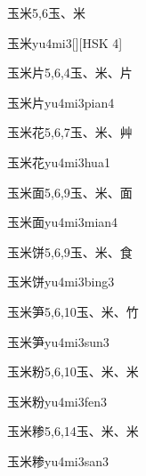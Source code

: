 \begin{entry}{玉米}{5,6}{⽟、⽶}
  \begin{phonetics}{玉米}{yu4mi3}[][HSK 4]
  \end{phonetics}
\end{entry}

\begin{entry}{玉米片}{5,6,4}{⽟、⽶、⽚}
  \begin{phonetics}{玉米片}{yu4mi3pian4}
  \end{phonetics}
\end{entry}

\begin{entry}{玉米花}{5,6,7}{⽟、⽶、⾋}
  \begin{phonetics}{玉米花}{yu4mi3hua1}
  \end{phonetics}
\end{entry}

\begin{entry}{玉米面}{5,6,9}{⽟、⽶、⾯}
  \begin{phonetics}{玉米面}{yu4mi3mian4}
  \end{phonetics}
\end{entry}

\begin{entry}{玉米饼}{5,6,9}{⽟、⽶、⾷}
  \begin{phonetics}{玉米饼}{yu4mi3bing3}
  \end{phonetics}
\end{entry}

\begin{entry}{玉米笋}{5,6,10}{⽟、⽶、⽵}
  \begin{phonetics}{玉米笋}{yu4mi3sun3}
  \end{phonetics}
\end{entry}

\begin{entry}{玉米粉}{5,6,10}{⽟、⽶、⽶}
  \begin{phonetics}{玉米粉}{yu4mi3fen3}
  \end{phonetics}
\end{entry}

\begin{entry}{玉米糁}{5,6,14}{⽟、⽶、⽶}
  \begin{phonetics}{玉米糁}{yu4mi3san3}
  \end{phonetics}
\end{entry}

